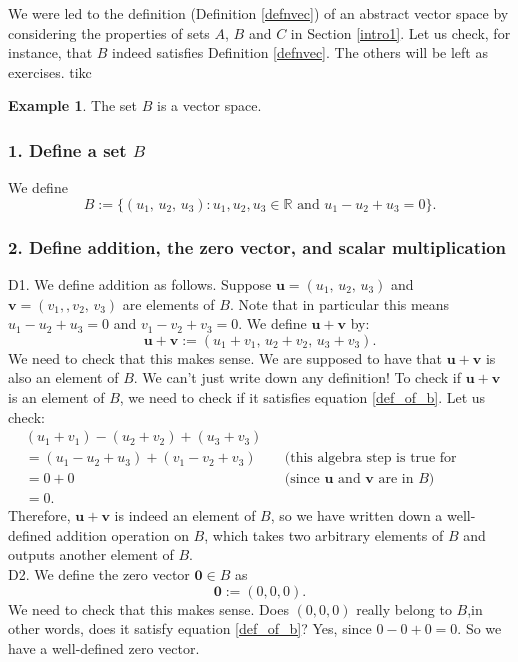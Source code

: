 \documentclass[a4paper,11pt]{book}
\theoremstyle{definition}
\newtheorem{example_environment}{Example}[chapter]
\newcommand{\be}{\begin{equation}}
\newcommand{\ee}{\end{equation}}
\newcommand{\ve}[1]{\mathbf{#1}}
\newenvironment{example}
	{
		\begin{oframed} 
		\begin{example_environment}
	}
	{
		\end{example_environment}
		\end{oframed}
	}
\begin{document}
We were led to the definition (Definition \ref{defnvec}) of an abstract vector space by considering the properties of sets $A$, $B$ and $C$ in Section \ref{intro1}. Let us check, for instance, that $B$ indeed satisfies Definition \ref{defnvec}. The others will be left as exercises.
tikc
\begin{example} The set $B$ is a vector space.
\subsubsection{1. Define a set $B$}
We define
\be \label{def_of_b}
 B := \{ (u_1, \, u_2, \, u_3) : u_1, u_2, u_3 \in \mathbb{R} \mbox{ and } u_1 - u_2 + u_3 = 0\} .
\ee

\subsubsection{2. Define addition, the zero vector, and scalar multiplication}
D1. We define addition as follows. Suppose $\ve{u} = (u_1, \, u_2, \, u_3)$ and $\ve{v} = (v_1, , v_2, \, v_3)$ are elements of $B$. Note that in particular this means $u_1 - u_2 + u_3 = 0$ and $v_1 - v_2 + v_3 = 0$. We define $\ve{u} + \ve{v}$ by:
\be \label{def_add_in_B}
 \ve{u} + \ve{v} := (u_1 + v_1, \, u_2 + v_2, \, u_3 + v_3).
\ee
We need to check that this makes sense. We are supposed to have that $\ve{u} + \ve{v}$ is also an element of $B$. We can't just write down any definition! To check if $\ve{u} + \ve{v}$ is an element of $B$, we need to check if it satisfies equation \eqref{def_of_b}. Let us check:
\begin{align*}
 &(u_1 + v_1) - (u_2 + v_2) + (u_3 + v_3) \\
 &= (u_1 - u_2 + u_3) + (v_1 - v_2 + v_3) && \mbox{(this algebra step is true for ordinary numbers)} \\
 &= 0 + 0 && \mbox{(since $\ve{u}$ and $\ve{v}$ are in $B$)} \\
 &= 0.
\end{align*}
Therefore, $\ve{u} + \ve{v}$ is indeed an element of $B$, so we have written down a well-defined addition operation on $B$, which takes two arbitrary elements of $B$ and outputs another element of $B$. \\

\noindent D2. We define the zero vector $\ve{0} \in B$ as
\be \label{zero_vec_in_B}
 \ve{0} := (0, 0, 0).
\ee
We need to check that this makes sense. Does $(0,0,0)$ really belong to $B$,in other words, does it satisfy equation \eqref{def_of_b}? Yes, since $0 - 0 + 0 = 0$. So we have a well-defined zero vector. \\


\end{example}
\end{document}
